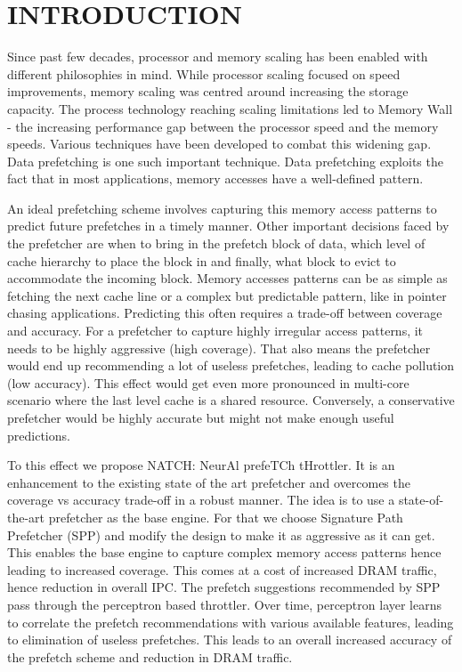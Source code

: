 \section{INTRODUCTION}
\label{Introduction}
Since past few decades, processor and memory scaling has been enabled
with different philosophies in mind.  While processor scaling focused
on speed improvements, memory scaling was centred around increasing
the storage capacity.  The process technology reaching scaling
limitations led to Memory Wall\cite{MemWall} - the increasing
performance gap between the processor speed and the memory speeds.
Various techniques have been developed to combat this widening gap.
Data prefetching is one such important technique.  Data prefetching
exploits the fact that in most applications, memory accesses have a
well-defined pattern.

An ideal prefetching scheme involves capturing this memory access
patterns to predict future prefetches in a timely manner.  Other
important decisions faced by the prefetcher are when to bring in the
prefetch block of data, which level of cache hierarchy to place the
block in and finally, what block to evict to accommodate the incoming
block.  Memory accesses patterns can be as simple as fetching the next
cache line or a complex but predictable pattern, like in pointer
chasing applications.  Predicting this often requires a trade-off
between coverage and accuracy.  For a prefetcher to capture highly
irregular access patterns, it needs to be highly aggressive (high
coverage).  That also means the prefetcher would end up recommending a
lot of useless prefetches, leading to cache pollution (low accuracy).
This effect would get even more pronounced in multi-core scenario
where the last level cache is a shared resource.  Conversely, a
conservative prefetcher would be highly accurate but might not make
enough useful predictions.

To this effect we propose NATCH: NeurAl prefeTCh tHrottler.  It
is an enhancement to the existing state of the art prefetcher and
overcomes the coverage vs accuracy trade-off in a robust manner.  The
idea is to use a state-of-the-art prefetcher as the base engine.
For that we choose Signature Path Prefetcher (SPP) and 
modify the design to make it as aggressive as it can get.
This enables the base engine to capture complex memory access patterns hence
leading to increased coverage.  This comes at a cost of increased DRAM
traffic, hence reduction in overall IPC.  The prefetch suggestions
recommended by SPP pass through the perceptron based throttler. Over
time, perceptron layer learns to correlate the prefetch recommendations 
with various available features, leading to elimination of
useless prefetches. This leads to an overall increased accuracy of
the prefetch scheme and reduction in DRAM traffic.


